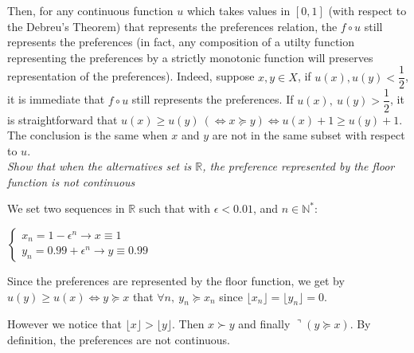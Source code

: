 \documentclass[11pt]{article} %
\begin{document}

Then, for any continuous function $u$ which takes values in $[0,1] $ (with respect to the Debreu's Theorem) that represents the preferences relation, the  $f \circ u $ still represents the preferences (in fact, any composition of a utilty function representing the preferences by a strictly monotonic function  will preserves representation of the preferences). Indeed, suppose $x, y \in X $, if $u(x), u(y) < \dfrac{1}{2} $, it is immediate that $f \circ u $ still represents the preferences. If  $u(x), \ u(y) > \dfrac{1}{2} $, it is straightforward that $u(x) \geq u(y) \ (\Leftrightarrow x \succeq y)  \Leftrightarrow u(x)+1 \geq u(y)+1 $. The conclusion is the same when $x$ and $y$ are not in the same subset with respect to $u$. \\

\textit{Show that when the alternatives set is $\mathbb{R} $, the preference represented by the floor function is not continuous}

We set two sequences in $\mathbb{R} $ such that with $\epsilon < 0.01 $, and $ n \in \mathbb{N^*}$:

$ \begin{cases}
x_n = 1 - \epsilon^n \rightarrow x \equiv 1 \\
y_n = 0.99 + \epsilon^n \rightarrow y \equiv 0.99 
\end{cases} $ 



Since the preferences are represented by the floor function, we get by $u(y) \geq u(x) \Leftrightarrow y \succeq x  $ that $ \forall n, \ y_n \succeq x_n$ since $  \lfloor x_n \rfloor = \lfloor y_n \rfloor = 0$.

However we notice that $  \lfloor x \rfloor > \lfloor y \rfloor $. Then $x \succ y$ and finally $\urcorner  (y \succeq x)$. By definition, the preferences are not continuous.  



 
\end{document}
